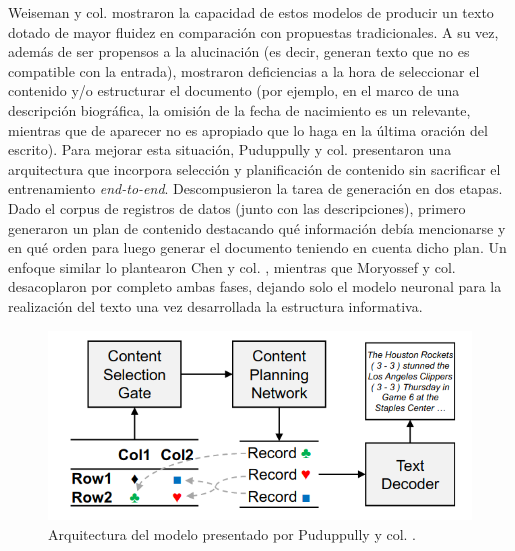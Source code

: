  Weiseman y col.  mostraron la capacidad de estos modelos de producir un texto dotado de mayor 
fluidez en comparación con propuestas tradicionales. A su vez, además de ser propensos a la alucinación (es decir, generan texto que no es compatible con la entrada), 
mostraron  deficiencias a la hora de seleccionar el contenido y/o estructurar el documento (por ejemplo, en el marco de una descripción biográfica, la omisión de la fecha de nacimiento es un relevante, 
mientras que de aparecer no es apropiado que lo haga en la última oración del escrito). Para mejorar esta situación, Puduppully y col.   
presentaron una arquitectura que incorpora selección y planificación de contenido sin sacrificar el entrenamiento \emph{end-to-end}. Descompusieron la tarea de generación en dos etapas. Dado el corpus de 
registros de datos (junto con las descripciones), primero generaron un plan de contenido destacando qué información debía mencionarse y en qué orden para luego generar el documento teniendo en 
cuenta dicho plan. Un enfoque similar lo plantearon Chen y col. , mientras que Moryossef y col.  desacoplaron por completo ambas fases, dejando solo el modelo 
neuronal para la realización del texto una vez desarrollada la estructura informativa.

        \begin{figure}[!]
            \begin{center}
                \includegraphics[scale=0.4]{Graphics/lapata_arquitectura.png}
            \end{center}
            \caption{Arquitectura del modelo presentado por Puduppully y col. .}
            \label{fig_lapata_arquitectura}
        \end{figure}


